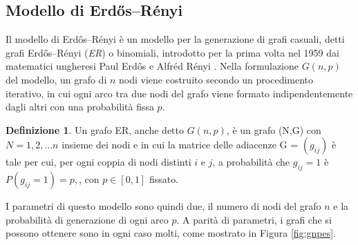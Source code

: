 \subsection{Modello di Erdős–Rényi}
Il modello di Erdős–Rényi è un modello per la generazione di grafi casuali, detti grafi Erdős–Rényi (\textsl{ER}) o binomiali, introdotto per la prima volta nel 1959 dai matematici ungheresi Paul Erdős e Alfréd Rényi \cite{erdos59a}. 
Nella formulazione $G(n,p)$ del modello,  un grafo di $n$ nodi viene costruito secondo un procedimento iterativo, in cui ogni arco tra due nodi del grafo viene formato indipendentemente dagli altri con una probabilità fissa $p$.  

\theoremstyle{definition}
\newtheorem{definizione}{Definizione}
\begin{definizione}
Un grafo ER, anche detto $G(n,p)$, è un grafo (N,G) con $N={1,2,\dots n}$ insieme dei nodi e in cui la matrice delle adiacenze G = $(g_{ij})$ è tale per cui, per ogni coppia di nodi distinti $i$ e $j$, a probabilità che $g_{ij} = 1$ è $P(g_{ij}=1)=p,$, con $p \in [0,1]$ fissato. 
\end{definizione}

I parametri di questo modello sono quindi due, il numero di nodi del grafo $n$ e la probabilità di generazione di ogni arco $p$.  A parità di parametri, i grafi che si possono ottenere sono in ogni caso molti, come mostrato in Figura \ref{fig:gnpes}. 

